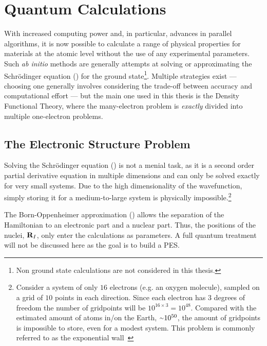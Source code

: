 \section{Quantum Calculations}
\label{sec:methods-qm}


With increased computing power and, in particular, advances in parallel algorithms, it is now possible to calculate a range of physical properties for materials at the atomic level without the use of any experimental parameters.
Such \textit{ab initio} methods are generally attempts at solving or approximating the Schr\"odinger equation () for the ground state\footnote{Non ground state calculations are not considered in this thesis.}.
Multiple strategies exist --- choosing one generally involves considering the trade-off between accuracy and computational effort --- but the main one used in this thesis is the Density Functional Theory, where the many-electron problem is \emph{exactly} divided into multiple one-electron problems.

\subsection{The Electronic Structure Problem}
Solving the Schr\"odinger equation () is not a menial task, as it is a second order partial derivative equation in multiple dimensions and can only be solved exactly for very small systems.
Due to the high dimensionality of the wavefunction, simply storing it for a medium-to-large system is physically impossible.\footnote{Consider a system of only $16$ electrons (e.g. an oxygen molecule), sampled on a grid of $10$ points in each direction. Since each electron has 3 degrees of freedom the number of gridpoints will be $10^{16\times3} = 10^{48}$. Compared with the estimated amount of atoms in/on the Earth, $\mytilde10^{50}$, the amount of gridpoints is impossible to store, even for a modest system. This problem is commonly referred to as the exponential wall~\cite{kohn-1999}}

The Born-Oppenheimer approximation () allows the separation of the Hamiltonian to an electronic part and a nuclear part.
Thus, the positions of the nuclei, ${\mathrm{\mathbf{\bm{R}}}}_I$, only enter the calculations as parameters.
A full quantum treatment will not be discussed here as the goal is to build a PES.


